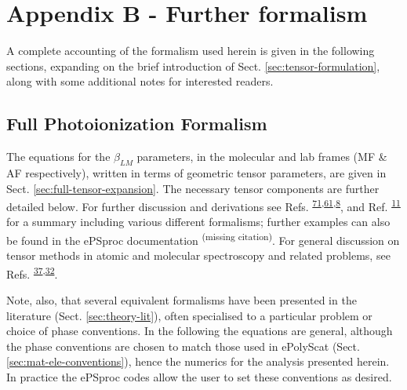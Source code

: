 \documentclass[10pt]{article}
\begin{document}
\section{Appendix B - Further formalism\label{sec:Appendix-B}}

A complete accounting of the formalism used herein is given in the following sections, expanding on the brief introduction of Sect. \ref{sec:tensor-formulation}, along with some additional notes for interested readers.

\subsection{Full Photoionization Formalism \label{appendix:formalism}}


The equations for the \(\beta_{LM}\) parameters, in the molecular and
lab frames (MF \& AF respectively), written in terms of geometric
tensor parameters, are given in Sect. \ref{sec:full-tensor-expansion}. The necessary tensor components are further detailed below. For further discussion and derivations see Refs. \textsuperscript{\hyperref[csl:71]{71},\hyperref[csl:61]{61},\hyperref[csl:8]{8}}, and Ref. \textsuperscript{\hyperref[csl:11]{11}} for a summary including various different formalisms; further examples can also be found in the ePSproc documentation \textsuperscript{(missing citation)}. For general discussion on tensor methods in atomic and molecular spectroscopy and related problems, see Refs. \textsuperscript{\hyperref[csl:37]{37},\hyperref[csl:32]{32}}. 

Note, also, that several equivalent formalisms have been presented in the literature (Sect. \ref{sec:theory-lit}), often specialised to a particular problem or choice of phase conventions. In the following the equations are general, although the phase conventions are chosen to match those used in ePolyScat (Sect. \ref{sec:mat-ele-conventions}), hence the numerics for the analysis presented herein. In practice the ePSproc codes allow the user to set these conventions as desired. %

\end{document}
